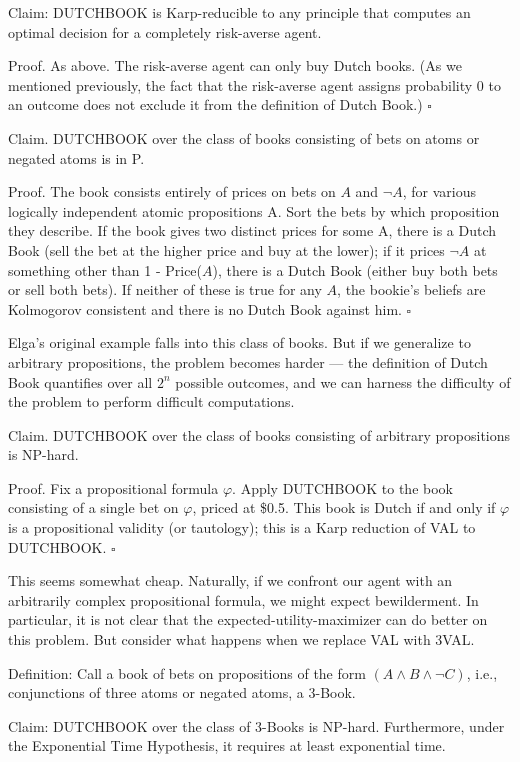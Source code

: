 \documentclass[letterpaper,12pt]{article}
\renewcommand{\phi}{\varphi}
\begin{document}
Claim: DUTCHBOOK is Karp-reducible to any principle that computes an optimal decision for a completely risk-averse agent.

Proof. As above. The risk-averse agent can only buy Dutch books. (As we mentioned previously, the fact that the risk-averse agent assigns probability 0 to an outcome does not exclude it from the definition of Dutch Book.) $\square$

Claim. DUTCHBOOK over the class of books consisting of bets on atoms or negated atoms is in P.

Proof. The book consists entirely of prices on bets on $A$ and $\neg A$, for various logically independent atomic propositions A. Sort the bets by which proposition they describe. If the book gives two distinct prices for some A, there is a Dutch Book (sell the bet at the higher price and buy at the lower); if it prices $\neg A$ at something other than 1 - Price($A$), there is a Dutch Book (either buy both bets or sell both bets). If neither of these is true for any $A$, the bookie's beliefs are Kolmogorov consistent and there is no Dutch Book against him. $\square$

Elga's original example falls into this class of books. But if we generalize to arbitrary propositions, the problem becomes harder --- the definition of Dutch Book quantifies over all $2^n$ possible outcomes, and we can harness the difficulty of the problem to perform difficult computations.

Claim. DUTCHBOOK over the class of books consisting of arbitrary propositions is NP-hard.

Proof. Fix a propositional formula $\phi$. Apply DUTCHBOOK to the book consisting of a single bet on $\phi$, priced at \$0.5. This book is Dutch if and only if $\phi$ is a propositional validity (or tautology); this is a Karp reduction of VAL to DUTCHBOOK. $\square$

This seems somewhat cheap. Naturally, if we confront our agent with an arbitrarily complex propositional formula, we might expect bewilderment. In particular, it is not clear that the expected-utility-maximizer can do better on this problem. But consider what happens when we replace VAL with 3VAL.

Definition: Call a book of bets on propositions of the form  $(A \land B \land \neg C)$, i.e., conjunctions of three atoms or negated atoms, a 3-Book.

Claim: DUTCHBOOK over the class of 3-Books is NP-hard. Furthermore, under the Exponential Time Hypothesis, it requires at least exponential time.
\end{document}
